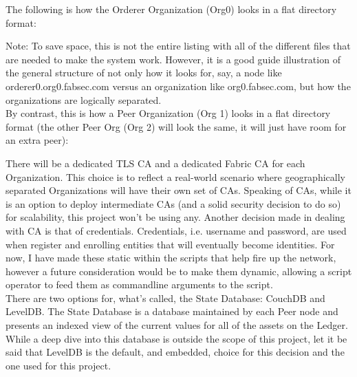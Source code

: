 		\hspace{10mm}The following is how the Orderer Organization (Org0) looks in a flat directory format:
	
		
	
		\hspace{10mm}Note: To save space, this is not the entire listing with all of the different files that are needed to make the system work. However, it is a good guide illustration of the general structure of not only how it looks for, say, a node like orderer0.org0.fabsec.com versus an organization like org0.fabsec.com, but how the organizations are logically separated.\\
		
		\hspace{10mm}By contrast, this is how a Peer Organization (Org 1) looks in a flat directory format (the other Peer Org (Org 2) will look the same, it will just have room for an extra peer):
		
		
	
		\hspace{10mm}There will be a dedicated TLS CA and a dedicated Fabric CA for each Organization. This choice is to reflect a real-world scenario where geographically separated Organizations will have their own set of CAs. Speaking of CAs, while it is an option to deploy intermediate CAs (and a solid security decision to do so) for scalability, this project won't be using any. Another decision made in dealing with CA is that of credentials. Credentials, i.e. username and password, are used when register and enrolling entities that will eventually become identities. For now, I have made these static within the scripts that help fire up the network, however a future consideration would be to make them dynamic, allowing a script operator to feed them as commandline arguments to the script.\\
	
		\hspace{10mm}There are two options for, what's called, the State Database: CouchDB and LevelDB. The State Database is a database maintained by each Peer node and presents an indexed view of the current values for all of the assets on the Ledger. While a deep dive into this database is outside the scope of this project, let it be said that LevelDB is the default, and embedded, choice for this decision and the one used for this project.\\
	
